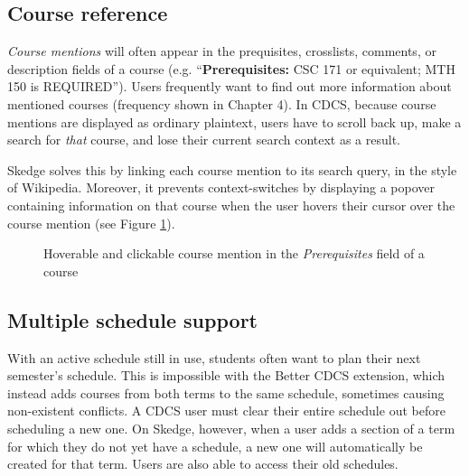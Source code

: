 \subsection{Course reference}

\emph{Course mentions} will often appear in the prequisites, crosslists, comments, or description fields of a course (e.g. ``\textbf{Prerequisites:} CSC 171 or equivalent; MTH 150 is REQUIRED''). Users frequently want to find out more information about mentioned courses (frequency shown in Chapter 4). In CDCS, because course mentions are displayed as ordinary plaintext, users have to scroll back up, make a search for \emph{that} course, and lose their current search context as a result.

Skedge solves this by linking each course mention to its search query, in the style of Wikipedia. Moreover, it prevents context-switches by displaying a popover containing information on that course when the user hovers their cursor over the course mention (see Figure \ref{fig:sk-hover}).

\begin{figure}[ht]
  \centering
  \vspace{2pt}
  \caption{Hoverable and clickable course mention in the \emph{Prerequisites} field of a course} \label{fig:sk-hover}
\end{figure}

\subsection{Multiple schedule support}

With an active schedule still in use, students often want to plan their next semester's schedule. This is impossible with the Better CDCS extension, which instead adds courses from both terms to the same schedule, sometimes causing non-existent conflicts. A CDCS user must clear their entire schedule out before scheduling a new one. On Skedge, however, when a user adds a section of a term for which they do not yet have a schedule, a new one will automatically be created for that term. Users are also able to access their old schedules.

